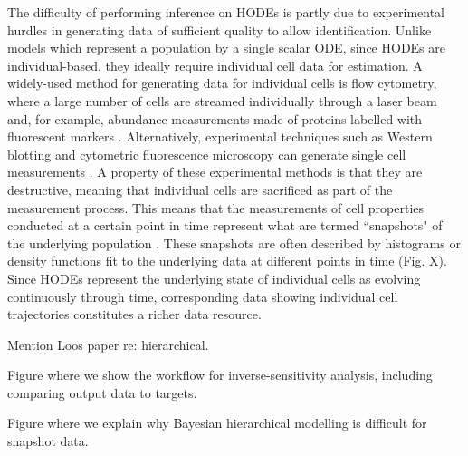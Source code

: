 \documentclass[10pt,letterpaper]{article}
\begin{document}
The difficulty of performing inference on HODEs is partly due to experimental hurdles in generating data of sufficient quality to allow identification. Unlike models which represent a population by a single scalar ODE, since HODEs are individual-based, they ideally require individual cell data for estimation. A widely-used method for generating data for individual cells is flow cytometry, where a large number of cells are streamed individually through a laser beam and, for example, abundance measurements made of proteins labelled with fluorescent markers \cite{telford2012flow}. Alternatively, experimental techniques such as Western blotting and cytometric fluorescence microscopy can generate single cell measurements \cite{hughes2014single,hasenauer2011identification}. A property of these experimental methods is that they are destructive, meaning that individual cells are sacrificed as part of the measurement process. This means that the measurements of cell properties conducted at a certain point in time represent what are termed ``snapshots" of the underlying population \cite{hasenauer2011identification}. These snapshots are often described by histograms \cite{dixit2018maximum} or density functions \cite{waldherr2018estimation} fit to the underlying data at different points in time (Fig. X). Since HODEs represent the underlying state of individual cells as evolving continuously through time, corresponding data showing individual cell trajectories constitutes a richer data resource.


Mention Loos paper re: hierarchical.



Figure where we show the workflow for inverse-sensitivity analysis, including comparing output data to targets.

Figure where we explain why Bayesian hierarchical modelling is difficult for snapshot data.





\linenumbers
\end{document}
